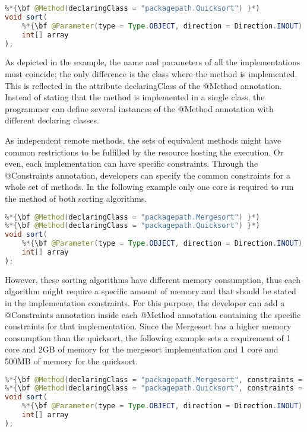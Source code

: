 \begin{lstlisting}[language=java]
%*{\bf @Method(declaringClass = "packagepath.Mergesort") }*)
%*{\bf @Method(declaringClass = "packagepath.Quicksort") }*)                       
void sort(
    %*{\bf @Parameter(type = Type.OBJECT, direction = Direction.INOUT) }*)
    int[] array
);
\end{lstlisting}

As depicted in the example, the name and parameters of all the implementations must coincide; the only
difference is the class where the method is implemented. This is reflected in the attribute declaringClass of
the @Method annotation. Instead of stating that the method is implemented in a single class, the
programmer can define several instances of the @Method annotation with different declaring classes.

As independent remote methods, the sets of equivalent methods might have common restrictions to be
fulfilled by the resource hosting the execution. Or even, each implementation can have specific constraints.
Through the @Constraints annotation, developers can specify the common constraints for a whole set of
methods. In the following example only one core is required to run the method of both sorting algorithms.

\begin{lstlisting}[language=java]
%*{\bf @Constraints(computingUnits = "1") }*)
%*{\bf @Method(declaringClass = "packagepath.Mergesort") }*)
%*{\bf @Method(declaringClass = "packagepath.Quicksort") }*)  
void sort(
    %*{\bf @Parameter(type = Type.OBJECT, direction = Direction.INOUT) }*)
    int[] array
);
\end{lstlisting}

However, these sorting algorithms have different memory consumption, thus each algorithm might require a
specific amount of memory and that should be stated in the implementation constraints. For this purpose, the
developer can add a @Constraints annotation inside each @Method annotation containing the specific constraints for that
implementation. Since the Mergesort has a higher memory consumption than the quicksort, the following
example sets a requirement of 1 core and 2GB of memory for the mergesort implementation and 1 core and
500MB of memory for the quicksort.

\begin{lstlisting}[language=java]
%*{\bf @Constraints(computingUnits = "1") }*)
%*{\bf @Method(declaringClass = "packagepath.Mergesort", constraints = @Constraints(memorySize = "2.0")) }*)
%*{\bf @Method(declaringClass = "packagepath.Quicksort", constraints = @Constraints(memorySize = "0.5")) }*)
void sort(
    %*{\bf @Parameter(type = Type.OBJECT, direction = Direction.INOUT) }*)
    int[] array
);
\end{lstlisting}


